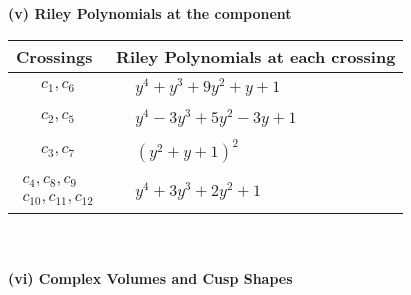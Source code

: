 \documentclass[1p]{elsarticle_modified}
\theoremstyle{definition}
\begin{document}
\newpage\renewcommand{\arraystretch}{1}
\flushleft \textbf{(v) Riley Polynomials at the component}\newline \\
\begin{tabular}{m{50pt}|m{274pt}}
Crossings & \hspace{64pt}Riley Polynomials at each crossing \\
\hline $$\begin{aligned}c_{1},c_{6}\end{aligned}$$&$\begin{aligned}
&y^4+y^3+9 y^2+y+1
\end{aligned}$\\
\hline $$\begin{aligned}c_{2},c_{5}\end{aligned}$$&$\begin{aligned}
&y^4-3 y^3+5 y^2-3 y+1
\end{aligned}$\\
\hline $$\begin{aligned}c_{3},c_{7}\end{aligned}$$&$\begin{aligned}
&(y^2+y+1)^2
\end{aligned}$\\
\hline $$\begin{aligned}c_{4},c_{8},c_{9}\\c_{10},c_{11},c_{12}\end{aligned}$$&$\begin{aligned}
&y^4+3 y^3+2 y^2+1
\end{aligned}$\\
\hline
\end{tabular}\\~\\
\newpage\flushleft \textbf{(vi) Complex Volumes and Cusp Shapes}
\end{document}
